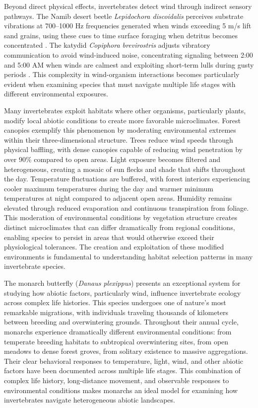 Beyond direct physical effects, invertebrates detect wind through indirect sensory pathways. The Namib desert beetle \textit{Lepidochora discoidalis} perceives substrate vibrations at 700--1000 Hz frequencies generated when winds exceeding 5 m/s lift sand grains, using these cues to time surface foraging when detritus becomes concentrated \citep{seelySandstormsTenebrionidBeetles1997}. The katydid \textit{Copiphora brevirostris} adjusts vibratory communication to avoid wind-induced noise, concentrating signaling between 2:00 and 5:00 AM when winds are calmest and exploiting short-term lulls during gusty periods \citep{rohmerGoneWindSignal2010}. This complexity in wind-organism interactions becomes particularly evident when examining species that must navigate multiple life stages with different environmental exposures.

Many invertebrates exploit habitats where other organisms, particularly plants, modify local abiotic conditions to create more favorable microclimates. Forest canopies exemplify this phenomenon by moderating environmental extremes within their three-dimensional structure. Trees reduce wind speeds through physical baffling, with dense canopies capable of reducing wind penetration by over 90\% compared to open areas. Light exposure becomes filtered and heterogeneous, creating a mosaic of sun flecks and shade that shifts throughout the day. Temperature fluctuations are buffered, with forest interiors experiencing cooler maximum temperatures during the day and warmer minimum temperatures at night compared to adjacent open areas. Humidity remains elevated through reduced evaporation and continuous transpiration from foliage. This moderation of environmental conditions by vegetation structure creates distinct microclimates that can differ dramatically from regional conditions, enabling species to persist in areas that would otherwise exceed their physiological tolerances. The creation and exploitation of these modified environments is fundamental to understanding habitat selection patterns in many invertebrate species.

The monarch butterfly (\textit{Danaus plexippus}) presents an exceptional system for studying how abiotic factors, particularly wind, influence invertebrate ecology across complex life histories. This species undergoes one of nature's most remarkable migrations, with individuals traveling thousands of kilometers between breeding and overwintering grounds. Throughout their annual cycle, monarchs experience dramatically different environmental conditions: from temperate breeding habitats to subtropical overwintering sites, from open meadows to dense forest groves, from solitary existence to massive aggregations. Their clear behavioral responses to temperature, light, wind, and other abiotic factors have been documented across multiple life stages. This combination of complex life history, long-distance movement, and observable responses to environmental conditions makes monarchs an ideal model for examining how invertebrates navigate heterogeneous abiotic landscapes.

